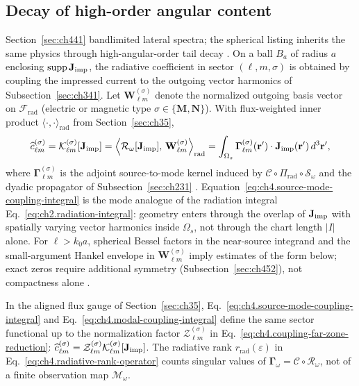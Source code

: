 \subsection{Decay of high-order angular content}
\label{sec:ch443}
Section~\ref{sec:ch441} bandlimited lateral spectra; the spherical listing inherits the same physics through high-angular-order tail decay \cite{hansen1988}.
On a ball $B_a$ of radius $a$ enclosing $\operatorname{supp}\mathbf{J}_{\mathrm{imp}}$, the radiative coefficient in sector $(\ell,m,\sigma)$ is obtained by coupling the impressed current to the outgoing vector harmonics of Subsection~\ref{sec:ch341}.
Let $\mathbf{W}_{\ell m}^{(\sigma)}$ denote the normalized outgoing basis vector on $\mathcal{F}_{\mathrm{rad}}$ (electric or magnetic type $\sigma\in\{\mathbf{M},\mathbf{N}\}$).
With flux-weighted inner product $\langle\cdot,\cdot\rangle_{\mathrm{rad}}$ from Section~\ref{sec:ch35},
\begin{equation}
\label{eq:ch4.source-mode-coupling-integral}
\widehat{c}_{\ell m}^{(\sigma)}
=
\mathcal{K}_{\ell m}^{(\sigma)}[\mathbf{J}_{\mathrm{imp}}]
=
\left\langle
\mathcal{R}_\omega[\mathbf{J}_{\mathrm{imp}}],\,
\mathbf{W}_{\ell m}^{(\sigma)}
\right\rangle_{\mathrm{rad}}
=
\int_{\Omega_s}
\boldsymbol{\Gamma}_{\ell m}^{(\sigma)}(\mathbf{r}')\cdot\mathbf{J}_{\mathrm{imp}}(\mathbf{r}')\,d^{3}\mathbf{r}',
\end{equation}
where $\boldsymbol{\Gamma}_{\ell m}^{(\sigma)}$ is the adjoint source-to-mode kernel induced by $\mathcal{C}\circ\Pi_{\mathrm{rad}}\circ\mathcal{S}_\omega$ and the dyadic propagator of Subsection~\ref{sec:ch231} \cite{stratton1941,hansen1988}.
Equation~\eqref{eq:ch4.source-mode-coupling-integral} is the mode analogue of the radiation integral Eq.~\eqref{eq:ch2.radiation-integral}: geometry enters through the overlap of $\mathbf{J}_{\mathrm{imp}}$ with spatially varying vector harmonics inside $\Omega_s$, not through the chart length $|I|$ alone.
For $\ell>k_0 a$, spherical Bessel factors in the near-source integrand and the small-argument Hankel envelope in $\mathbf{W}_{\ell m}^{(\sigma)}$ imply estimates of the form below; exact zeros require additional symmetry (Subsection~\ref{sec:ch452}), not compactness alone \cite{jackson1999}.
\begin{proposition}
\label{prop:ch4.source-mode-alignment}
In the aligned flux gauge of Section~\ref{sec:ch35}, Eq.~\eqref{eq:ch4.source-mode-coupling-integral} and
Eq.~\eqref{eq:ch4.modal-coupling-integral} define the same sector functional up to the normalization factor
$\mathcal{Z}_{\ell m}^{(\sigma)}$ in Eq.~\eqref{eq:ch4.coupling-far-zone-reduction}:
$\widehat{c}_{\ell m}^{(\sigma)}=\mathcal{Z}_{\ell m}^{(\sigma)}\mathcal{K}_{\ell m}^{(\sigma)}[\mathbf{J}_{\mathrm{imp}}]$.
The radiative rank $r_{\mathrm{rad}}(\varepsilon)$ in Eq.~\eqref{eq:ch4.radiative-rank-operator} counts singular values of
$\boldsymbol{\Gamma}_\omega=\mathcal{C}\circ\mathcal{R}_\omega$, not of a finite observation map $\boldsymbol{\mathcal{M}}_\omega$.
\end{proposition}
